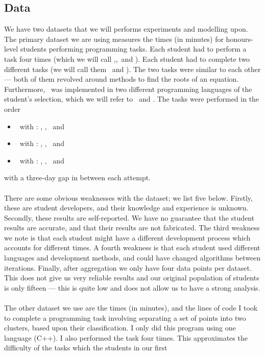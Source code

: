 \subsection{Data} \label{subsecData}

We have two datasets that we will performs experiments and modelling upon.
The primary dataset we are using measures the times (in minutes) for
honours-level students performing programming tasks.
Each student had to perform a task four times (which we will call \AZ,\AO,\AT\ 
and \ATh).
Each student had to complete two different tasks (we will call them \PO\ and
\PT).
The two tasks were similar to each other --- both of them revolved around
methods to find the roots of an equation.
Furthermore, \PO\ was implemented in two different programming languages of the
student's selection, which we will refer to \LA\ and \LB.
The tasks were performed in the order
\begin{itemize}
  \item \PO\ with \LA: \AZ, \AO, \AT\ and \ATh
  \item \PT\ with \LA: \AZ, \AO, \AT\ and \ATh
  \item \PO\ with \LB: \AZ, \AO, \AT\ and \ATh
\end{itemize}
with a three-day gap in between each attempt.\\
\\
There are some obvious weaknesses with the dataset; we list five below.
Firstly, these are student developers, and their knowledge and experience is
unknown.
Secondly, these results are self-reported.
We have no guarantee that the student results are accurate, and that their
results are not fabricated.
The third weakness we note is that each student might have a different
development process which accounts for different times.
A fourth weakness is that each student used different languages and development
methods, and could have changed algorithms between iterations.
Finally, after aggregation we only have four data points per dataset.
This does not give us very reliable results and our original population of
students is only fifteen --- this is quite low and does not allow us to have a
strong analysis.\\
\\
The other dataset we use are the times (in minutes), and the lines of code I
took to complete a programming task involving separating a set of points into
two clusters, based upon their classification.
I only did this program using one language (C++).
I also performed the task four times.
This approximates the difficulty of the tasks which the students in our first
